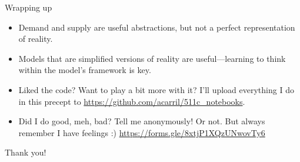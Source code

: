 \documentclass[10pt]{beamer}
\begin{document}





\begin{frame}{Wrapping up}
    \begin{itemize}
        \item Demand and supply are useful abstractions, but not a perfect representation of reality.
        \item Models that are simplified versions of reality are useful---learning to think within the model's framework is key.
        \item Liked the code? Want to play a bit more with it? I'll upload everything I do in this precept to \url{https://github.com/acarril/511c_notebooks}.
        \item Did I do good, meh, bad? Tell me anonymously! Or not. But always remember I have feelings :)\vspace{\baselineskip}
        \url{https://forms.gle/8xtjP1XQzUNwovTy6}
    \end{itemize}
    \vspace{\baselineskip}Thank you!
\end{frame}
\end{document}
